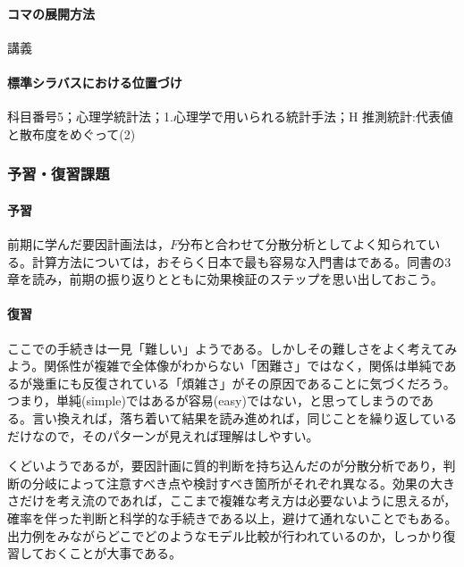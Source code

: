 \paragraph{コマの展開方法}
講義
\paragraph{標準シラバスにおける位置づけ}
科目番号5；心理学統計法；1.心理学で用いられる統計手法；H 推測統計:代表値と散布度をめぐって(2)
\subsubsection{予習・復習課題}
\paragraph{予習}
前期に学んだ要因計画法は，$F$分布と合わせて分散分析としてよく知られている。計算方法については，おそらく日本で最も容易な入門書は\citet{大村201301}である。同書の3章を読み，前期の振り返りとともに効果検証のステップを思い出しておこう。
\paragraph{復習}
ここでの手続きは一見「難しい」ようである。しかしその難しさをよく考えてみよう。関係性が複雑で全体像がわからない「困難さ」ではなく，関係は単純であるが幾重にも反復されている「煩雑さ」がその原因であることに気づくだろう。つまり，単純(simple)ではあるが容易(easy)ではない，と思ってしまうのである。言い換えれば，落ち着いて結果を読み進めれば，同じことを繰り返しているだけなので，そのパターンが見えれば理解はしやすい。

くどいようであるが，要因計画に質的判断を持ち込んだのが分散分析であり，判断の分岐によって注意すべき点や検討すべき箇所がそれぞれ異なる。効果の大きさだけを考え流のであれば，ここまで複雑な考え方は必要ないように思えるが，確率を伴った判断と科学的な手続きである以上，避けて通れないことでもある。出力例をみながらどこでどのようなモデル比較が行われているのか，しっかり復習しておくことが大事である。

